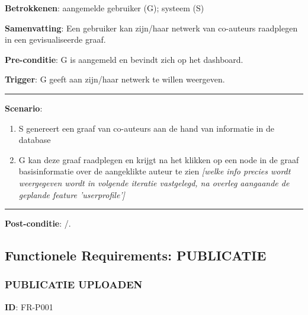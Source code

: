 \noindent \textbf{Betrokkenen}: aangemelde gebruiker (G); systeem (S) 
\vspace{2 mm}

\noindent \textbf{Samenvatting}: Een gebruiker kan zijn/haar netwerk van co-auteurs raadplegen in een gevisualiseerde graaf. 
\vspace{2 mm}

\noindent \textbf{Pre-conditie}: G is aangemeld en bevindt zich op het dashboard.
\vspace{2 mm}

\noindent \textbf{Trigger}: G geeft aan zijn/haar netwerk te willen weergeven. 

\vspace{4 mm}
\hrule
\vspace{2 mm}
\noindent \textbf{Scenario}:
\begin{enumerate}
\item S genereert een graaf van co-auteurs aan de hand van informatie in de database
\item G kan deze graaf raadplegen en krijgt na het klikken op een node in de graaf basisinformatie over de aangeklikte auteur te zien \textit{[welke info precies wordt weergegeven wordt in volgende iteratie vastgelegd, na overleg aangaande de geplande feature 'userprofile']} 
\end{enumerate}
\vspace{2 mm}
\hrule
\vspace{4 mm}

\noindent \textbf{Post-conditie}: /. \\






\clearpage




\subsection{Functionele Requirements: PUBLICATIE}
\vspace{4 mm}

\subsubsection{PUBLICATIE UPLOADEN}
\vspace{2 mm}

\textbf{ID}: FR-P001
\vspace{2 mm}

